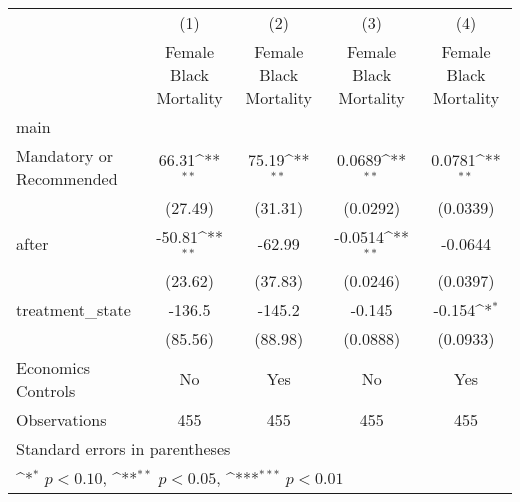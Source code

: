 {
\def\sym#1{\ifmmode^{#1}\else\(^{#1}\)\fi}
\begin{longtable}{l*{4}{c}}
\hline\hline\endfirsthead\hline\endhead\hline\endfoot\endlastfoot
                    &\multicolumn{1}{c}{(1)}&\multicolumn{1}{c}{(2)}&\multicolumn{1}{c}{(3)}&\multicolumn{1}{c}{(4)}\\
                    &\multicolumn{1}{c}{Female Black Mortality}&\multicolumn{1}{c}{Female Black Mortality}&\multicolumn{1}{c}{Female Black Mortality}&\multicolumn{1}{c}{Female Black Mortality}\\
\hline
main                &                     &                     &                     &                     \\
Mandatory or Recommended&       66.31\sym{**} &       75.19\sym{**} &      0.0689\sym{**} &      0.0781\sym{**} \\
                    &     (27.49)         &     (31.31)         &    (0.0292)         &    (0.0339)         \\
[1em]
after               &      -50.81\sym{**} &      -62.99         &     -0.0514\sym{**} &     -0.0644         \\
                    &     (23.62)         &     (37.83)         &    (0.0246)         &    (0.0397)         \\
[1em]
treatment\_state     &      -136.5         &      -145.2         &      -0.145         &      -0.154\sym{*}  \\
                    &     (85.56)         &     (88.98)         &    (0.0888)         &    (0.0933)         \\
[1em]
Economics Controls  &          No         &         Yes         &          No         &         Yes         \\
\hline
Observations        &         455         &         455         &         455         &         455         \\
\hline\hline
\multicolumn{5}{l}{\footnotesize Standard errors in parentheses}\\
\multicolumn{5}{l}{\footnotesize \sym{*} \(p<0.10\), \sym{**} \(p<0.05\), \sym{***} \(p<0.01\)}\\
\end{longtable}
}
